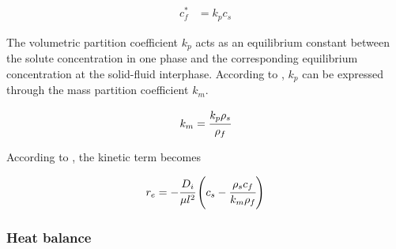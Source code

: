 \documentclass[../Article_Model_Parameters.tex]{subfiles}
\begin{document}
			{\footnotesize
				\begin{align} \label{Linear_equilibirum}
					c_f^* &= k_p c_s
			\end{align} }
			
			The volumetric partition coefficient $k_p$ acts as an equilibrium constant between the solute concentration in one phase and the corresponding equilibrium concentration at the solid-fluid interphase. According to \citet{Spiro2007}, $k_p$ can be expressed through the mass partition coefficient $k_m$.
			
			{\footnotesize
				\begin{align}
					k_m = \cfrac{k_p \rho_s}{\rho_f}
			\end{align} }
			
			According to \citet{Reverchon1996}, the kinetic term becomes
			
			{\footnotesize
				\begin{equation}
					\label{Model_kinetic_no_sat}
					r_e = -\cfrac{D_i}{ \mu l^2 } \left(c_s - \cfrac{\rho_s c_f}{k_m \rho_f} \right)
			\end{equation} }

        

		\subsubsection{Heat balance} \label{CH: heat_balance}
		
\end{document}
